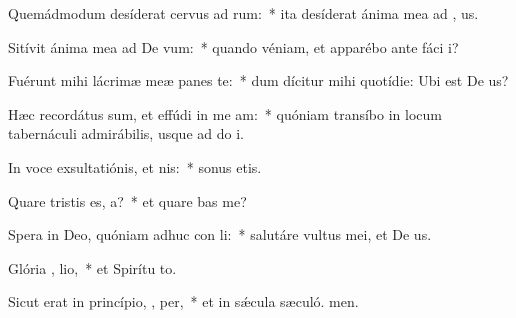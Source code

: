 \item Quemádmodum desíderat cervus ad  rum:~* ita desíderat ánima mea ad , us.
\item Sitívit ánima mea ad De  vum:~* quando véniam, et apparébo ante fáci i?
\item Fuérunt mihi lácrimæ meæ panes   te:~* dum dícitur mihi quotídie: Ubi est De us?
\item Hæc recordátus sum, et effúdi in me  am:~* quóniam transíbo in locum tabernáculi admirábilis, usque ad do i.
\item In voce exsultatiónis, et nis:~* sonus etis.
\item Quare tristis es,  a?~* et quare bas me?
\item Spera in Deo, quóniam adhuc con li:~* salutáre vultus mei, et De us.
\item Glória ,  lio,~* et Spirítu to.
\item Sicut erat in princípio,  ,  per,~* et in sǽcula sæculó. men.
